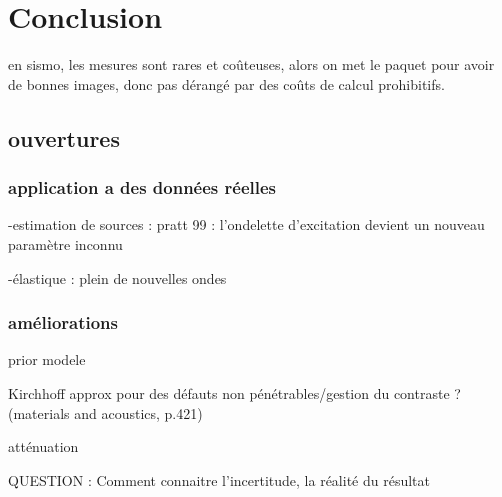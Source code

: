 \chapter{Conclusion}

en sismo, les mesures sont rares et coûteuses, alors on met le paquet pour avoir de bonnes images, donc pas dérangé par des coûts de calcul prohibitifs.

\section{ouvertures}

\subsection{application a des données réelles}
-estimation de sources : pratt 99 : l'ondelette d'excitation devient un nouveau paramètre inconnu 

-élastique : plein de nouvelles ondes 


\subsection{améliorations}
prior modele

Kirchhoff approx pour des défauts non pénétrables/gestion du contraste ? (materials and acoustics, p.421)

atténuation

QUESTION : 
Comment connaitre l'incertitude, la réalité du résultat
